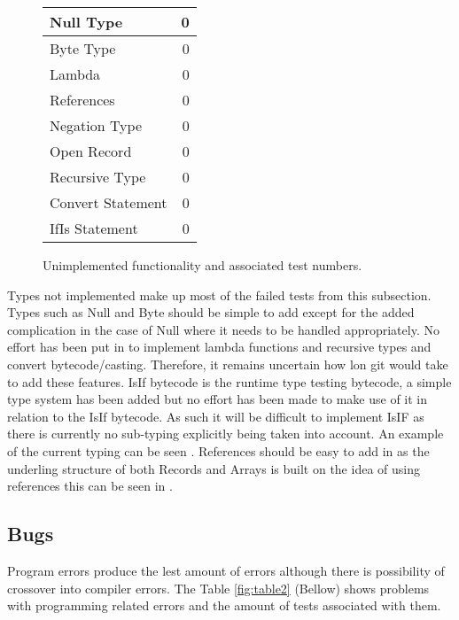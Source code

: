 \begin{figure}[H]
  \centering
  \begin{tabular}{| l || r |}
  \hline
  Null Type & 0 \\ \hline
  Byte Type & 0 \\ \hline
  Lambda & 0 \\ \hline
  References & 0 \\ \hline
  Negation Type & 0 \\ \hline
  Open Record & 0 \\ \hline
  Recursive Type & 0 \\ \hline
  Convert Statement& 0 \\ \hline
  IfIs Statement & 0 \\ 
  \hline
  \end{tabular}
  \caption{Unimplemented functionality and associated test numbers.}
  \label{fig:table1}
\end{figure}

Types not implemented make up most of the failed tests from this subsection. Types such as Null and Byte should be simple to add except for the added complication in the case of Null where it needs to be handled appropriately. %
No effort has been put in to implement lambda functions and recursive types and convert bytecode/casting. Therefore, it remains uncertain how lon git would take to add these features. IsIf bytecode is the runtime type testing bytecode, a simple type system has been added but no effort has been made to make use of it in relation to the IsIf bytecode.  As such it will be difficult to implement IsIF as there is currently no sub-typing explicitly being taken into account. An example of the current typing can be seen %
. 
References should be easy to add in as the underling structure of both Records and Arrays is built on the idea of using references this can be seen in %
. %

\subsection{Bugs}


Program errors produce the lest amount of errors although there is possibility of crossover into compiler errors. The Table \ref{fig:table2} (Bellow) shows problems with programming related errors and the amount of tests associated with them.


